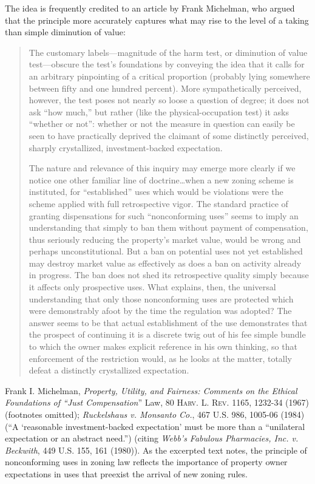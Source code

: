 The idea is frequently credited to an article by Frank Michelman, who argued
that the principle more accurately captures what may rise to the level of a
taking than simple diminution of value:
\begin{quotation}
The customary labels---magnitude of the harm test, or diminution of value
test---obscure the test's foundations by conveying the idea that it calls for an
arbitrary pinpointing of a critical proportion (probably lying somewhere between
fifty and one hundred percent). More sympathetically perceived, however, the
test poses not nearly so loose a question of degree; it does not ask ``how
much,'' but rather (like the physical-occupation test) it asks ``whether or
not'': whether or not the measure in question can easily be seen to have
practically deprived the claimant of some distinctly perceived, sharply
crystallized, investment-backed expectation.

The nature and relevance of this inquiry may emerge more clearly if we notice
one other familiar line of doctrine\ldots when a new zoning scheme is
instituted, for ``established'' uses which would be violations were the scheme
applied with full retrospective vigor. The standard practice of granting
dispensations for such ``nonconforming uses'' seems to imply an understanding
that simply to ban them without payment of compensation, thus seriously reducing
the property's market value, would be wrong and perhaps unconstitutional. But a
ban on potential uses not yet established may destroy market value as
effectively as does a ban on activity already in progress. The ban does not shed
its retrospective quality simply because it affects only prospective uses. What
explains, then, the universal understanding that only those nonconforming uses
are protected which were demonstrably afoot by the time the regulation was
adopted? The answer seems to be that actual establishment of the use
demonstrates that the prospect of continuing it is a discrete twig out of his
fee simple bundle to which the owner makes explicit reference in his own
thinking, so that enforcement of the restriction would, as he looks at the
matter, totally defeat a distinctly crystallized expectation.
\end{quotation}
Frank I. Michelman, \textit{Property, Utility, and Fairness: Comments on the
Ethical Foundations of ``Just Compensation}'' Law, 80 \textsc{Harv. L. Rev}.
1165, 1232-34 (1967) (footnotes omitted); \emph{Ruckelshaus v. Monsanto Co.},
467 U.S. 986, 1005-06 (1984) (``A `reasonable investment-backed expectation'
must be more than a ``unilateral expectation or an abstract need.'') (citing
\textit{Webb's Fabulous Pharmacies, Inc. v. Beckwith}, 449 U.S. 155, 161
(1980)). As the excerpted text notes, the principle of nonconforming uses in
zoning law reflects the importance of property owner expectations in uses that
preexist the arrival of new zoning rules.

